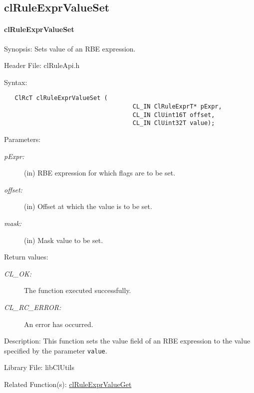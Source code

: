 \begin{flushleft}
\subsection{clRuleExprValueSet}
\hypertarget{pagerule112}{}\paragraph{cl\-Rule\-Expr\-Value\-Set}\label{pagerule112}
\begin{Desc}
\item[Synopsis:]Sets value of an RBE expression.\end{Desc}
\begin{Desc}
\item[Header File:]clRuleApi.h\end{Desc}
\begin{Desc}
\item[Syntax:]

\footnotesize\begin{verbatim}   ClRcT clRuleExprValueSet (
                              		CL_IN ClRuleExprT* pExpr,
                              		CL_IN ClUint16T offset,
                              		CL_IN ClUint32T value);
\end{verbatim}
\normalsize
\end{Desc}
\begin{Desc}
\item[Parameters:]
\begin{description}
\item[{\em p\-Expr:}](in) RBE expression for which flags are to be set. \item[{\em offset:}](in) Offset at which the value is to be set. 
\item[{\em mask:}](in) Mask value to be set.\end{description}
\end{Desc}
\begin{Desc}
\item[Return values:]
\begin{description}
\item[{\em CL\_\-OK:}]The function executed successfully. \item[{\em CL\_\-RC\_\-ERROR:}]An error has occurred.\end{description}
\end{Desc}
\begin{Desc}
\item[Description:]This function sets the value field of an RBE expression to the value specified by the parameter {\tt{value}}.\end{Desc}
\begin{Desc}
\item[Library File:]lib\-Cl\-Utils\end{Desc}
\begin{Desc}
\item[Related Function(s):]\hyperlink{pagerule112}{cl\-Rule\-Expr\-Value\-Get} \end{Desc}
\newpage



\end{flushleft}
